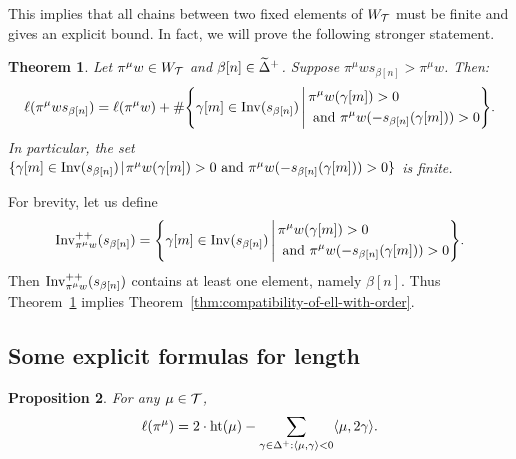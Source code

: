 \documentclass[10pt]{amsart}
\newtheorem{theo}{Theorem}[section]
\newtheorem{prop}[theo]{Proposition}
\begin{document}
This implies that all chains between two fixed elements of $W_{\mathcal{T}}$ must be finite and gives an explicit bound. In fact, we will prove the following stronger statement.
\begin{theo}\label{thm-length-formula-for-sbeta-inversion-set}
Let $\pi^\mu w \in W_{\mathcal{T}}$ and $\beta[n]\in\widetilde{\Delta}^+$. Suppose $\pi^\mu w s_{\beta[n]} > \pi^\mu w$. Then:
\begin{equation}
\ell(\pi^\mu w s_{\beta[n]}) = \ell(\pi^\mu w) + \#\! \left\{ \gamma[m] \in \operatorname{Inv}(s_{\beta[n]}) \,\middle|\,
\begin{aligned}
&\pi^\mu w(\gamma[m]) > 0 \\& \text{ and } \pi^\mu w(-s_{\beta[n]}(\gamma[m])) > 0 
\end{aligned} \right\}\!.
\end{equation}
In particular, the set $\{ \gamma[m] \in \operatorname{Inv}(s_{\beta[n]}) \!\mid\! \pi^\mu w(\gamma[m]) > 0 \text{ and } \pi^\mu w(-s_{\beta[n]}(\gamma[m])) > 0 \} $ is finite.
\end{theo}

For brevity, let us define
\begin{equation}
\operatorname{Inv}^{++}_{\pi^\mu w }(s_{\beta[n]}) = \left\{\gamma[m] \in \operatorname{Inv}(s_{\beta[n]}) \,\middle|\,
\begin{aligned}
&\pi^\mu w(\gamma[m]) > 0 \\ &\text{ and } \pi^\mu w(-s_{\beta[n]}(\gamma[m])) > 0 \end{aligned}\right\}\!.
\end{equation}
Then $\operatorname{Inv}^{++}_{\pi^\mu w}(s_{\beta[n]})$ contains at least one element, namely $\beta[n]$. Thus Theorem~\ref{thm-length-formula-for-sbeta-inversion-set} implies Theorem~\ref{thm:compatibility-of-ell-with-order}.

\subsection{Some explicit formulas for length}

\begin{prop}\label{prop-height-formula}
For any $\mu\in\mathcal{T}$,
\begin{equation}\label{eq:15}
\ell(\pi^\mu) = 2 \cdot \height(\mu) - \sum_{\gamma\in\Delta^+: \langle \mu, \gamma \rangle < 0} \langle \mu, 2\gamma \rangle.
\end{equation}
\end{prop}
\end{document}
